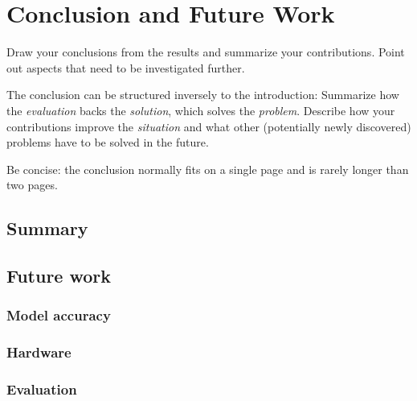 \chapter{Conclusion and Future Work}
\label{ch:conclusion}

Draw your conclusions from the results and summarize your contributions.
Point out aspects that need to be investigated further.

The conclusion can be structured inversely to the introduction:
Summarize how the \emph{evaluation} backs the \emph{solution}, which solves the \emph{problem}.
Describe how your contributions improve the \emph{situation} and what other (potentially newly discovered) problems have to be solved in the future.

Be concise: the conclusion normally fits on a single page and is rarely longer than two pages.


\section{Summary}
\label{sec:conclusion_summary}

\section{Future work}
\label{sec:conclusion_future_work}

\subsection{Model accuracy}
\label{subsec:future_accuracy}

\subsection{Hardware}
\label{subsec:future_hardware}

\subsection{Evaluation}
\label{subsec:future_evaluation}
